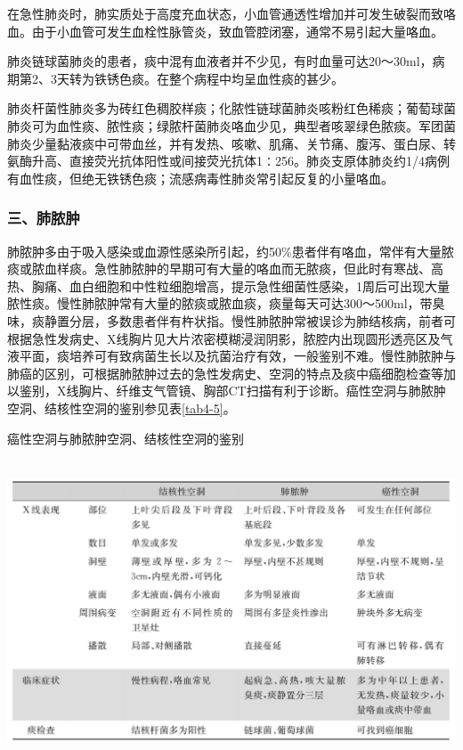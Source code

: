 在急性肺炎时，肺实质处于高度充血状态，小血管通透性增加并可发生破裂而致咯血。由于小血管可发生血栓性脉管炎，致血管腔闭塞，通常不易引起大量咯血。

肺炎链球菌肺炎的患者，痰中混有血液者并不少见，有时血量可达20～30ml，病期第2、3天转为铁锈色痰。在整个病程中均呈血性痰的甚少。

肺炎杆菌性肺炎多为砖红色稠胶样痰；化脓性链球菌肺炎咳粉红色稀痰；葡萄球菌肺炎可为血性痰、脓性痰；绿脓杆菌肺炎咯血少见，典型者咳翠绿色脓痰。军团菌肺炎少量黏液痰中可带血丝，并有发热、咳嗽、肌痛、关节痛、腹泻、蛋白尿、转氨酶升高、直接荧光抗体阳性或间接荧光抗体1∶256。肺炎支原体肺炎约1/4病例有血性痰，但绝无铁锈色痰；流感病毒性肺炎常引起反复的小量咯血。

\subsubsection{三、肺脓肿}

肺脓肿多由于吸入感染或血源性感染所引起，约50\%患者伴有咯血，常伴有大量脓痰或脓血样痰。急性肺脓肿的早期可有大量的咯血而无脓痰，但此时有寒战、高热、胸痛、血白细胞和中性粒细胞增高，提示急性细菌性感染，1周后可出现大量脓性痰。慢性肺脓肿常有大量的脓痰或脓血痰，痰量每天可达300～500ml，带臭味，痰静置分层，多数患者伴有杵状指。慢性肺脓肿常被误诊为肺结核病，前者可根据急性发病史、X线胸片见大片浓密模糊浸润阴影，脓腔内出现圆形透亮区及气液平面，痰培养可有致病菌生长以及抗菌治疗有效，一般鉴别不难。慢性肺脓肿与肺癌的区别，可根据肺脓肿过去的急性发病史、空洞的特点及痰中癌细胞检查等加以鉴别，X线胸片、纤维支气管镜、胸部CT扫描有利于诊断。癌性空洞与肺脓肿空洞、结核性空洞的鉴别参见表\ref{tab4-5}。

\begin{table}[htbp]
\centering
\caption{癌性空洞与肺脓肿空洞、结核性空洞的鉴别}
\label{tab4-5}
\includegraphics[width=5.97917in,height=3.53125in]{./images/Image00042.jpg}
\end{table}

